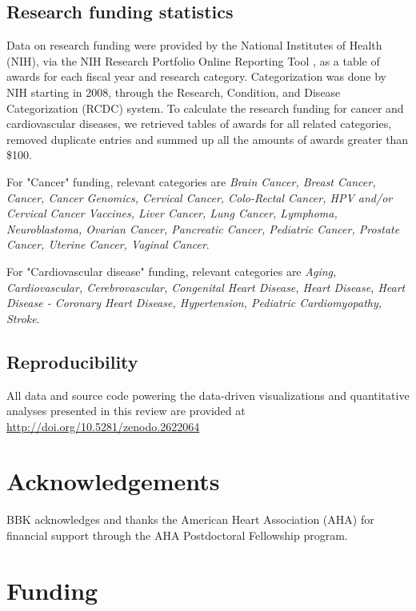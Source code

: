 \documentclass[letter]{bib}
\begin{document}
\begin{methods}
    
    \subsection*{Research funding statistics}
Data on research funding were provided by the National Institutes of Health (NIH), via the NIH Research Portfolio Online Reporting Tool \citep{NationalInstituteofHealth:2018:Estimates}, as a table of awards for each fiscal year and research category. Categorization was done by NIH starting in 2008, through the Research, Condition, and Disease Categorization (RCDC) system. To calculate the research funding for cancer and cardiovascular diseases, we retrieved tables of awards for all related categories, removed duplicate entries and summed up all the amounts of awards greater than \$100.

For "Cancer" funding, relevant categories are \protect\textit{Brain Cancer, Breast Cancer, Cancer, Cancer Genomics, Cervical Cancer, Colo-Rectal Cancer, HPV and/or Cervical Cancer Vaccines, Liver Cancer, Lung Cancer, Lymphoma, Neuroblastoma, Ovarian Cancer, Pancreatic Cancer, Pediatric Cancer, Prostate Cancer, Uterine Cancer, Vaginal Cancer}.

For "Cardiovascular disease" funding, relevant categories are {\protect\textit{Aging, Cardiovascular, Cerebrovascular, Congenital Heart Disease, Heart Disease, Heart Disease - Coronary Heart Disease, Hypertension, Pediatric Cardiomyopathy, Stroke}}.

\subsection*{Reproducibility}
 All data and source code powering the data-driven visualizations and quantitative analyses presented in this review are provided at \url{http://doi.org/10.5281/zenodo.2622064}
 
\end{methods}
	\enlargethispage{12pt}
	
	
	
	
	\section*{Acknowledgements}
	
	BBK acknowledges and thanks the American Heart Association (AHA) for financial support through the AHA Postdoctoral Fellowship program.
	\vspace*{-12pt}
	
	\section*{Funding}
	
\end{document}
